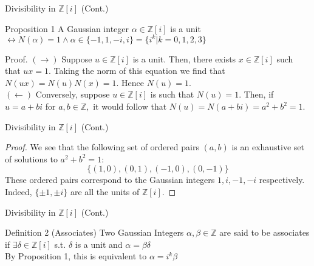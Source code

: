 \begin{frame}{Divisibility in $\mathbb{Z}[i]$ (Cont.)}
    \begin{block}{Proposition 1}
        A Gaussian integer $\alpha \in \mathbb{Z}[i]$ is a unit $\leftrightarrow N(\alpha) = 1 \land \alpha \in \{-1, 1, -i, i\} = \{i^k | k = 0, 1, 2, 3\}$
    \end{block}
    
    \begin{block}{Proof.}
        $(\rightarrow)$ Suppose $u\in\mathbb{Z}[i]$ is a unit. Then, there exists $x\in\mathbb{Z}[i]$ such that $ux=1.$ Taking the norm of this equation we find that $N(ux)=N(u)N(x)=1.$ Hence $N(u)=1.$\\
        
        $(\leftarrow)$ Conversely, suppose $u\in\mathbb{Z}[i]$ is such that $N(u)=1.$ Then, if $u=a+bi$ for $a,b\in\mathbb{Z},$ it would follow that $N(u)=N(a+bi)=a^2+b^2=1.$ 
    \end{block}
\end{frame}




\begin{frame}{Divisibility in $\mathbb{Z}[i]$ (Cont.)}
    \begin{proof}
    We see that the following set of ordered pairs $(a,b)$ is an exhaustive set of solutions to $a^2+b^2=1:$
$$\{(1,0),(0,1),(-1,0),(0,-1)\}$$
These ordered pairs correspond to the Gaussian integers $1,i,-1,-i$ respectively. Indeed, $\{\pm1,\pm i\}$ are all the units of $\mathbb{Z}[i].$ 
    \end{proof}
\end{frame}




\begin{frame}{Divisibility in $\mathbb{Z}[i]$ (Cont.)}
    \begin{block}{Definition 2 (Associates)}
        Two Gaussian Integers $\alpha, \beta \in \mathbb{Z}$ are said to be associates if $\exists \delta \in \mathbb{Z}[i]$ s.t. $\delta$ is a unit and $\alpha = \beta \delta$\\
        By Proposition 1, this is equivalent to $\alpha = i^k\beta$
    \end{block}
\end{frame}




